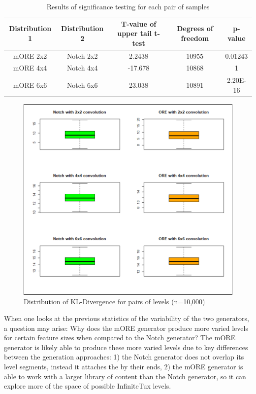 \begin{table}[h]
\centering
\begin{tabular}{| c | c | c | c | c |}
\hline
Distribution 1 & Distribution 2 & T-value of upper tail t-test & Degrees of freedom & p-value\\
\hline
mORE 2x2 & Notch 2x2 & 2.2438 & 10955 & 0.01243\\
mORE 4x4 & Notch 4x4 & -17.678 & 10868 & 1\\
mORE 6x6 & Notch 6x6 & 23.038 & 10891 & 2.20E-16\\
\hline
\end{tabular}
\caption{Results of significance testing for each pair of samples}
\label{table:t-test}
\end{table}

\begin{figure}[h]
    \centering
    \includegraphics[width=\linewidth]{img/fig16-boxplot.png}
    \caption{Distribution of KL-Divergence for pairs of levels (n=10,000)}
    \label{fig:boxplot}
\end{figure}

When one looks at the previous statistics of the variability of the two generators, a
question may arise: Why does the mORE generator produce more varied levels for certain
feature sizes when compared to the Notch generator? The mORE generator is likely able to 
produce these more varied levels due to key differences between the generation approaches:
1) the Notch generator does not overlap its level segments, instead it attaches the by
their ends, 2) the mORE generator is able to work with a larger library of content than the
Notch generator, so it can explore more of the space of possible InfiniteTux levels.

